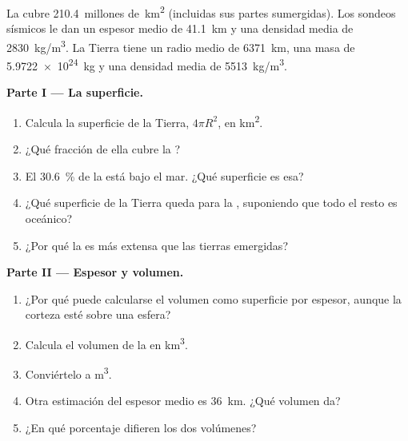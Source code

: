 \begin{problem}
\label{pb:g12:continental-crust:1}
La  cubre \num{210.4}~millones de~\unit{km^2} (incluidas
sus partes sumergidas). Los sondeos sísmicos le dan un espesor medio de
\qty{41.1}{km} y una densidad media de \qty{2830}{kg/m^3}. La Tierra tiene un
radio medio de \qty{6371}{km}, una masa de \qty{5.9722e24}{kg} y una densidad
media de \qty{5513}{kg/m^3}.

\medskip
\noindent\textbf{Parte I --- La superficie.}
\begin{enumerate}
  \item Calcula la superficie de la Tierra, $4\pi R^2$, en
        \unit{km^2}.
  \item ¿Qué fracción de ella cubre la ?
  \item El \qty{30.6}{\percent} de la  está bajo el mar.
        ¿Qué superficie es esa?
  \item ¿Qué superficie de la Tierra queda para la ,
        suponiendo que todo el resto es oceánico?
  \item ¿Por qué la  es más extensa que las tierras emergidas?
\end{enumerate}

\medskip
\noindent\textbf{Parte II --- Espesor y volumen.}
\begin{enumerate}[resume]
  \item ¿Por qué puede calcularse el volumen como superficie por espesor,
        aunque la corteza esté sobre una esfera?
  \item Calcula el volumen de la  en \unit{km^3}.
  \item Conviértelo a \unit{m^3}.
  \item Otra estimación del espesor medio es \qty{36}{km}. ¿Qué
        volumen da?
  \item ¿En qué porcentaje difieren los dos volúmenes?
\end{enumerate}


\end{problem}

